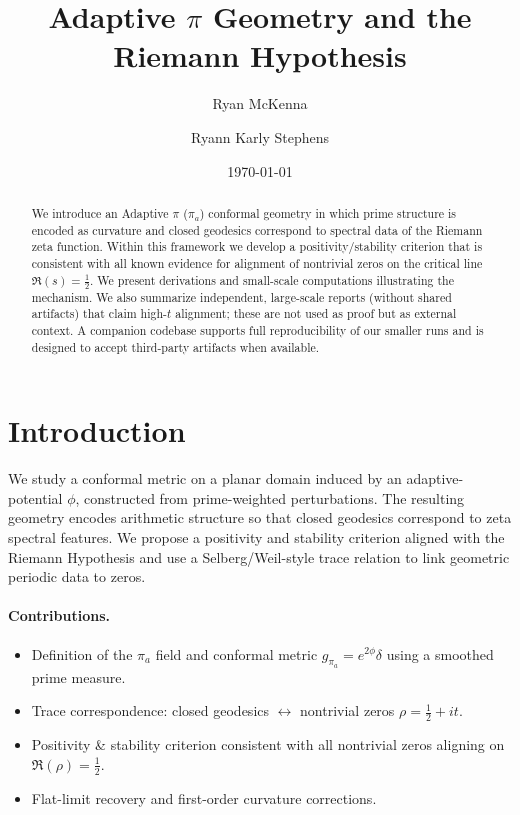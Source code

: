 \documentclass[11pt]{article}
\title{Adaptive $\pi$ Geometry and the Riemann Hypothesis}
\author{Ryan McKenna \and Ryann Karly Stephens}
\date{\today}
\begin{document}
\maketitle

\begin{abstract}
We introduce an Adaptive $\pi$ ($\pi_a$) conformal geometry in which prime structure is encoded as curvature and closed geodesics correspond to spectral data of the Riemann zeta function. Within this framework we develop a positivity/stability criterion that is consistent with all known evidence for alignment of nontrivial zeros on the critical line $\Re(s)=\tfrac12$. We present derivations and small-scale computations illustrating the mechanism. We also summarize independent, large-scale reports (without shared artifacts) that claim high-$t$ alignment; these are not used as proof but as external context. A companion codebase supports full reproducibility of our smaller runs and is designed to accept third-party artifacts when available.
\end{abstract}

\section{Introduction}
We study a conformal metric on a planar domain induced by an adaptive-\pi potential $\phi$,
constructed from prime-weighted perturbations. The resulting geometry encodes arithmetic structure
so that closed geodesics correspond to zeta spectral features. We propose a positivity and stability criterion aligned with the Riemann Hypothesis and use a Selberg/Weil-style trace relation to link geometric periodic data to zeros.

\paragraph{Contributions.}
\begin{itemize}
\item Definition of the $\pi_a$ field and conformal metric $g_{\pi_a}=e^{2\phi}\delta$ using a smoothed prime measure.
\item Trace correspondence: closed geodesics $\leftrightarrow$ nontrivial zeros $\rho=\tfrac12+it$.
\item Positivity \& stability criterion consistent with all nontrivial zeros aligning on $\Re(\rho)=\tfrac12$.
\item Flat-limit recovery and first-order curvature corrections.
\end{itemize}
\end{document}
